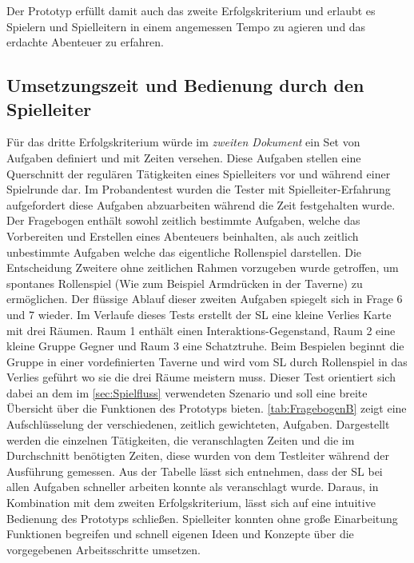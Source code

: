 Der Prototyp erfüllt damit auch das zweite Erfolgskriterium und erlaubt es Spielern und Spielleitern in einem angemessen Tempo zu agieren und das erdachte Abenteuer zu erfahren.




\subsection{Umsetzungszeit und Bedienung durch den Spielleiter}
\label{sec:UmsetzungszeitUndBedienungDurchDenSpielleiter}
Für das dritte Erfolgskriterium würde im \emph{zweiten Dokument} ein Set von Aufgaben definiert und mit Zeiten versehen. Diese Aufgaben stellen eine Querschnitt der regulären Tätigkeiten eines Spielleiters vor und während einer Spielrunde dar. Im Probandentest wurden die Tester mit Spielleiter-Erfahrung aufgefordert diese Aufgaben abzuarbeiten während die Zeit festgehalten wurde. Der Fragebogen enthält sowohl zeitlich bestimmte Aufgaben, welche das Vorbereiten und Erstellen eines Abenteuers beinhalten, als auch zeitlich unbestimmte Aufgaben welche das eigentliche Rollenspiel darstellen. Die Entscheidung Zweitere ohne zeitlichen Rahmen vorzugeben wurde getroffen, um spontanes Rollenspiel (Wie zum Beispiel Armdrücken in der Taverne) zu ermöglichen. Der flüssige Ablauf dieser zweiten Aufgaben spiegelt sich in Frage 6 und 7 wieder. Im Verlaufe dieses Tests erstellt der SL eine kleine Verlies Karte mit drei Räumen. Raum 1 enthält einen Interaktions-Gegenstand, Raum 2 eine kleine Gruppe Gegner und Raum 3 eine Schatztruhe.\newline
Beim Bespielen beginnt die Gruppe in einer vordefinierten Taverne und wird vom SL durch Rollenspiel in das Verlies geführt wo sie die drei Räume meistern muss. Dieser Test orientiert sich dabei an dem im \ref{sec:Spielfluss} verwendeten Szenario und soll eine breite Übersicht über die Funktionen des Prototyps bieten.\newline
\ref{tab:FragebogenB} zeigt eine Aufschlüsselung der verschiedenen, zeitlich gewichteten, Aufgaben. Dargestellt werden die einzelnen Tätigkeiten, die veranschlagten Zeiten und die im Durchschnitt benötigten Zeiten, diese wurden von dem Testleiter während der Ausführung gemessen. Aus der Tabelle lässt sich entnehmen, dass der SL bei allen Aufgaben schneller arbeiten konnte als veranschlagt wurde. Daraus, in Kombination mit dem zweiten Erfolgskriterium, lässt sich auf eine intuitive Bedienung des Prototyps schließen. Spielleiter konnten ohne große Einarbeitung Funktionen begreifen und schnell eigenen Ideen und Konzepte über die vorgegebenen Arbeitsschritte umsetzen. 
